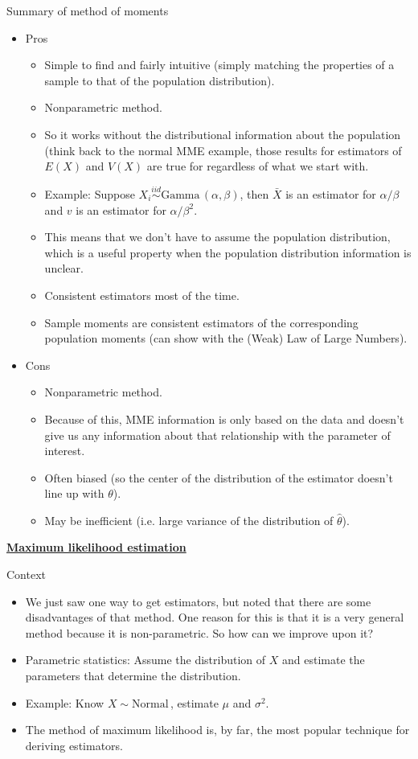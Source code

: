 \documentclass{article}
\newcommand{\bu}[1]{\textbf{\ul{#1}}}				%
\newcommand{\follow}[1]{\sim \text{#1}\,}		%
\newcommand{\followsp}[2]{\overset{#1}\sim \text{#2}\,}		%
\begin{document}
Summary of method of moments\bigskip
\begin{itemize}
    \item Pros
    \begin{itemize}
        \item Simple to find and fairly intuitive (simply matching the properties of a sample to that of the population distribution).
        \item Nonparametric method.
        \item[] So it works without the distributional information about the population (think back to the normal MME example, those results for estimators of $E(X)$ and $V(X)$ are true for regardless of what we start with.
        \item[] Example: Suppose $X_i \followsp{iid}{Gamma}(\alpha, \beta)$, then $\bar{X}$ is an estimator for $\alpha / \beta$ and $v$ is an estimator for $\alpha / \beta^2$.
        \item[] This means that we don't have to assume the population distribution, which is a useful property when the population distribution information is unclear.
        \item Consistent estimators most of the time.
        \item[] Sample moments are consistent estimators of the corresponding population moments (can show with the (Weak) Law of Large Numbers).
    \end{itemize}
    \item Cons
    \begin{itemize}
        \item Nonparametric method.
        \item[] Because of this, MME information is only based on the data and doesn't give us any information about that relationship with the parameter of interest.
        \item Often biased (so the center of the distribution of the estimator doesn't line up with $\theta$).
        \item May be inefficient (i.e. large variance of the distribution of $\hat{\theta}$).
    \end{itemize}
\end{itemize}\bigskip

\newpage

\bu{Maximum likelihood estimation}\bigskip

Context\bigskip
\begin{itemize}
    \item We just saw one way to get estimators, but noted that there are some disadvantages of that method. One reason for this is that it is a very general method because it is non-parametric. So how can we improve upon it?
    \item Parametric statistics: Assume the distribution of $X$ and estimate the parameters that determine the distribution.
    \item[] Example: Know $X \follow{Normal}$, estimate $\mu$ and $\sigma^2$.
    \item The method of maximum likelihood is, by far, the most popular technique for deriving estimators.
\end{itemize}\bigskip
\end{document}
